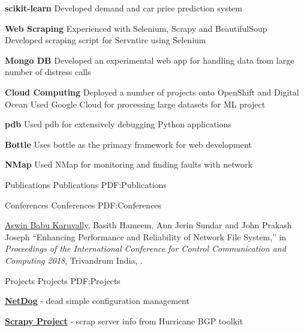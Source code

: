 \documentclass[letterpaper,MMMyyyy,nonstopmode]{simpleresumecv}
\begin{document}
\begin{Body}
\BigGap
\BulletItem
\textbf{scikit-learn}
\SubBulletItem
Developed demand and car price prediction system

\BigGap
\BulletItem
\textbf{Web Scraping}
\SubBulletItem
Experienced with Selenium, Scrapy and BeautifulSoup
\SubBulletItem
Developed scraping script for Servntire using Selenium

\BigGap
\BulletItem
\textbf{Mongo DB}
\SubBulletItem
Developed an experimental web app for handling data from large number of
distress calls

\BigGap
\BulletItem
\textbf{Cloud Computing}
\SubBulletItem
Deployed a number of projects onto OpenShift and Digital Ocean
\SubBulletItem
Used Google Cloud for processing large datasets for ML project

\BigGap
\BulletItem
\textbf{pdb}
\SubBulletItem
Used pdb for extensively debugging Python applications

\BigGap
\BulletItem
\textbf{Bottle}
\SubBulletItem
Uses bottle as the primary framework for web development

\BigGap
\BulletItem
\textbf{NMap}
\SubBulletItem
Used NMap for monitoring and finding faults with network


\pagebreak
\Section
{Publications}
{Publications}
{PDF:Publications}

\SubSection
{Conferences}
{Conferences}
{PDF:Conferences}

\begingroup
\renewcommand{\MaxNumberedItem}{[8888]}

\NumberedItem{[1]}
{\underline{Aswin Babu Karuvally}, Basith Hameem, Ann Jerin Sundar and John
Prakash Joseph ``Enhancing Performance and Reliability of Network File System,''
in \textit{Proceedings of the International Conference for Control Communication
and Computing 2018}, Trivandrum India,
.}

\endgroup


\BigGap
\Section
{Projects}
{Projects}
{PDF:Projects}

\BulletItem
\href{https://github.com/karuvally/project_green}
{\textbf{NetDog}} - dead simple configuration management
\hfill
{}

\BigGap
\BulletItem
\href{https://github.com/karuvally/scrapy_project}
{\textbf{Scrapy Project}} - scrap server info from Hurricane BGP toolkit
\hfill
{}


\end{Body}
\end{document}
